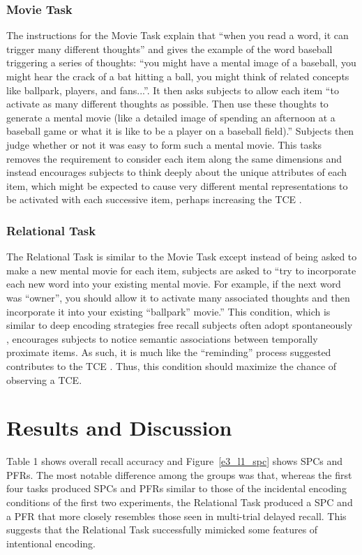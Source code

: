\documentclass[man,natbib,floatsintext]{apa6} %
\begin{document}
\subsubsection{Movie Task} The instructions for the Movie Task explain that ``when you read a word, it can trigger many different thoughts'' and gives the example of the word baseball triggering a series of thoughts: ``you might have a mental image of a baseball, you might hear the crack of a bat hitting a ball, you might think of related concepts like ballpark, players, and fans...''. It then asks subjects to allow each item ``to activate as many different thoughts as possible. Then use these thoughts to generate a mental movie (like a detailed image of spending an afternoon at a baseball game or what it is like to be a player on a baseball field).'' Subjects then judge whether or not it was easy to form such a mental movie. This tasks removes the requirement to consider each item along the same dimensions and instead encourages subjects to think deeply about the unique attributes of each item, which might be expected to cause very different mental representations to be activated with each successive item, perhaps increasing the TCE \citep[for a different prespective on the influence of item specific processing on the TCE, see][]{McDaEtal11}. 

\subsubsection{Relational Task} The Relational Task is similar to the Movie Task except instead of being asked to make a new mental movie for each item, subjects are asked to ``try to incorporate each new word into your existing mental movie. For example, if the next word was ``owner'', you should allow it to activate many associated thoughts and then incorporate it into your existing ``ballpark'' movie.'' This condition, which is similar to deep encoding strategies free recall subjects often adopt spontaneously \citep{DelaKnow05}, encourages subjects to notice semantic associations between temporally proximate items. As such, it is much like the ``reminding'' process \cite{Hint16} suggested contributes to the TCE \citep[for a similar manipulation see][]{BowClar69}. Thus, this condition should maximize the chance of observing a TCE. 

\section{Results and Discussion}
Table 1 shows overall recall accuracy and Figure~\ref{e3_l1_spc} shows SPCs and PFRs. The most notable difference among the groups was that, whereas the first four tasks produced SPCs and PFRs similar to those of the incidental encoding conditions of the first two experiments, the Relational Task produced a SPC and a PFR that more closely resembles those seen in multi-trial delayed recall. This suggests that the Relational Task successfully mimicked some features of intentional encoding.
\end{document}
